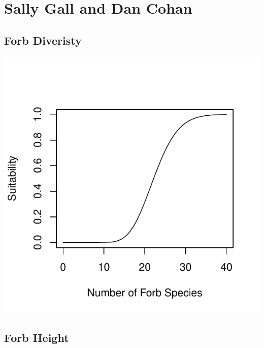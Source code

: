 \documentclass[12pt,letterpaper]{article}\usepackage{graphicx, color}
\makeatletter
\def\maxwidth{ %
  \ifdim\Gin@nat@width>\linewidth
    \linewidth
  \else
    \Gin@nat@width
  \fi
}
\newenvironment{knitrout}{}{} %
\makeatother
\begin{document}
\section{Sally Gall and Dan Cohan}
\subsection{Forb Diveristy}
\begin{knitrout}
\color{fgcolor}\includegraphics[width=\maxwidth]{figure/Sally-Dan_Forb_Diversity} 
\end{knitrout}

\subsection{Forb Height}
\end{document}
